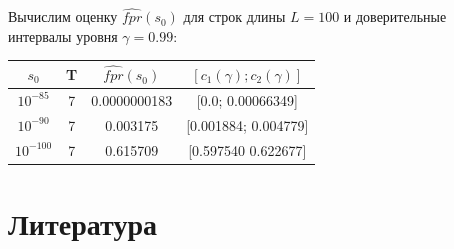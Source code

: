 \documentclass[]{article}
\begin{document}
			Вычислим оценку $\widehat{fpr}(s_{0})$ для строк длины $L=100$ и доверительные интервалы уровня $\gamma = 0.99$:
			\begin{center}
				\begin{tabular}{cccc}
					$s_{0}$&T&$\widehat{fpr}(s_{0})$&$[c_{1}(\gamma);c_{2}(\gamma)]$  \\ \hline
					$10^{-85}$&7&0.0000000183&[0.0; 0.00066349] \\
					$10^{-90}$&7&0.003175&[0.001884; 0.004779] \\ 
					$10^{-100}$&7&0.615709&[0.597540 0.622677] \\
				\end{tabular}
			\end{center}
			
			\section{Литература}
			\renewcommand{\refname}{}
			\vspace{-25pt}
			
			
						
\end{document}
